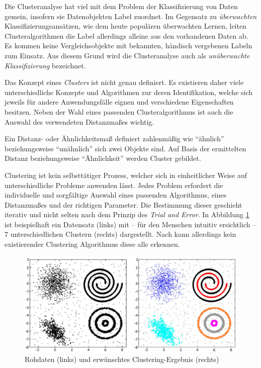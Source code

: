 Die Clusteranalyse hat viel mit dem Problem der Klassifizierung von Daten gemein, insofern sie Datenobjekten
Label zuordnet. Im Gegensatz zu \textit{überwachten} Klassifizierungsansätzen, wie dem heute populären überwachten
Lernen, leiten Clusteralgorithmen die Label allerdings alleine aus den vorhandenen Daten ab.
Es kommen keine Vergleichsobjekte mit bekannten, händisch vergebenen Labeln zum Einsatz.
Aus diesem Grund wird die Clusteranalyse auch als \textit{unüberwachte Klassifizierung} bezeichnet. \cite[]{tan2007introduction}

Das Konzept eines \textit{Clusters} ist nicht genau definiert. Es existieren daher viele unterschiedliche Konzepte
und Algorithmen zur deren Identifikation, welche sich jeweils für andere Anwendungsfälle eignen und verschiedene Eigenschaften
besitzen. Neben der Wahl eines passenden Clusteralgorithmus ist auch die Auswahl des verwendeten Distanzmaßes wichtig.

\begin{theorem}[Distanzmaß]
    Ein Distanz- oder Ähnlichkeitsmaß definiert zahlenmäßig wie ``ähnlich'' beziehungsweise ``unähnlich''
    sich zwei Objekte sind. Auf Basis der ermittelten Distanz beziehungsweise ``Ähnlichkeit'' werden
    Cluster gebildet.
\end{theorem}

Clustering ist kein selbsttätiger Prozess, welcher sich in
einheitlicher Weise auf unterschiedliche Probleme anwenden lässt. Jedes Problem erfordert die individuelle und sorgfältige
Auswahl eines passenden Algorithmus, eines Distanzmaßes und der richtigen Parameter. Die Bestimmung dieser geschieht
iterativ und nicht selten nach dem Prinzip des \textit{Trial and Error}. In Abbildung \ref{fig:grund_clustering_example}
ist beispielhaft ein Datensatz (links) mit -- für den Menschen intuitiv ersichtlich -- 7 unterschiedlichen Clustern (rechts)
dargestellt. Nach \cite[]{Jain2010} kann allerdings kein existierender Clustering Algorithmus diese alle erkennen.
\cite[]{Jain1999, tan2007introduction}

\begin{figure}[H]
    \centering
    \includegraphics[width=0.8\linewidth]{resources/img/grundlagen/clustering_example}
    \caption[Rohdaten und erwünschtes Clustering-Ergebnis]{Rohdaten (links) und erwünschtes Clustering-Ergebnis (rechts) \cite[]{Jain2010}}
    \label{fig:grund_clustering_example}
\end{figure}

